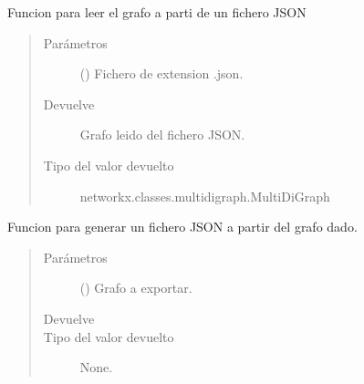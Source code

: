 \documentclass[letterpaper,10pt,spanish]{sphinxmanual}
\begin{document}
\begin{fulllineitems}
\label{\detokenize{Funciones:Funciones.importarGrafoJSON}}
\sphinxAtStartPar
Funcion para leer el grafo a parti de un fichero JSON
\begin{quote}\begin{description}
\item[{Parámetros}] \leavevmode
\sphinxAtStartPar
{} () \textendash{} Fichero de extension .json.

\item[{Devuelve}] \leavevmode
\sphinxAtStartPar
{} \textendash{} Grafo leido del fichero JSON.

\item[{Tipo del valor devuelto}] \leavevmode
\sphinxAtStartPar
networkx.classes.multidigraph.MultiDiGraph

\end{description}\end{quote}

\end{fulllineitems}


\begin{fulllineitems}
\label{\detokenize{Funciones:Funciones.exportarGrafoJSON}}
\sphinxAtStartPar
Funcion para generar un fichero JSON a partir del grafo dado.
\begin{quote}\begin{description}
\item[{Parámetros}] \leavevmode
\sphinxAtStartPar
{} () \textendash{} Grafo a exportar.

\item[{Devuelve}] \leavevmode
\sphinxAtStartPar


\item[{Tipo del valor devuelto}] \leavevmode
\sphinxAtStartPar
None.

\end{description}\end{quote}

\end{fulllineitems}
\end{document}
